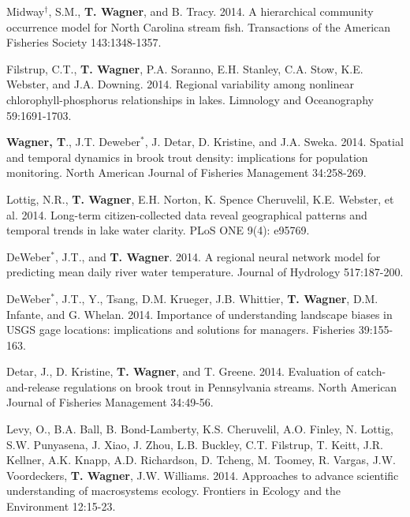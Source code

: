 \documentclass[10pt]{article}
\begin{document}
\begin{flushleft}
\begin{etaremune}[start=41]
\item Midway$^\dagger$, S.M., {\bf T. Wagner}, and B. Tracy. 2014. A hierarchical community occurrence model for North Carolina stream fish. Transactions of the American Fisheries Society 143:1348-1357.

\item Filstrup, C.T., {\bf T. Wagner}, P.A. Soranno, E.H. Stanley, C.A. Stow, K.E. Webster, and J.A. Downing. 2014. Regional variability among nonlinear chlorophyll-phosphorus relationships in lakes. Limnology and Oceanography 59:1691-1703. 

\item {\bf Wagner, T}., J.T. Deweber$^*$, J. Detar, D. Kristine, and J.A. Sweka. 2014. Spatial and temporal dynamics in brook trout density: implications for population monitoring. North American Journal of Fisheries Management 34:258-269.

\item Lottig, N.R., {\bf T. Wagner}, E.H. Norton, K. Spence Cheruvelil, K.E. Webster, et al. 2014. Long-term citizen-collected data reveal geographical patterns and temporal trends in lake water clarity. PLoS ONE 9(4): e95769. 

\item DeWeber$^*$, J.T., and {\bf T. Wagner}. 2014. A regional neural network model for predicting mean daily river water temperature. Journal of Hydrology 517:187-200.

\item DeWeber$^*$, J.T., Y., Tsang, D.M. Krueger, J.B. Whittier, {\bf T. Wagner}, D.M. Infante, and G. Whelan. 2014. Importance of understanding landscape biases in USGS gage locations: implications and solutions for managers. Fisheries 39:155-163. 

\item Detar, J., D. Kristine, {\bf T. Wagner}, and T. Greene. 2014. Evaluation of catch-and-release regulations on brook trout in Pennsylvania streams. North American Journal of Fisheries Management 34:49-56.

\item Levy, O., B.A. Ball, B. Bond-Lamberty, K.S. Cheruvelil,  A.O. Finley, N. Lottig, S.W. Punyasena, J. Xiao, J. Zhou, L.B. Buckley, C.T. Filstrup, T. Keitt, J.R. Kellner, A.K. Knapp, A.D. Richardson, D. Tcheng, M. Toomey, R. Vargas, J.W. Voordeckers, {\bf T.  Wagner}, J.W. Williams. 2014. Approaches to advance scientific understanding of macrosystems ecology. Frontiers in Ecology and the Environment 12:15-23. 


\end{etaremune}
\end{flushleft}
\end{document}
